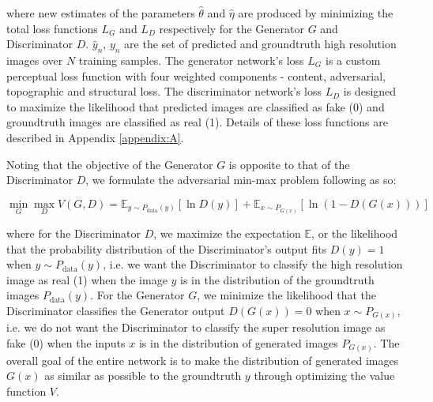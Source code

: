 \documentclass[tc, manuscript]{copernicus}
\begin{document}
where new estimates of the parameters $\hat{\theta}$ and $\hat{\eta}$ are produced by minimizing the total loss functions $L_G$ and $L_D$ respectively for the Generator $G$ and Discriminator $D$.
$\hat{y}_n$, $y_n$ are the set of predicted and groundtruth high resolution images over $N$ training samples.
The generator network's loss $L_G$ is a custom perceptual loss function with four weighted components - content, adversarial, topographic and structural loss.
The discriminator network's loss $L_D$ is designed to maximize the likelihood that predicted images are classified as fake (0) and groundtruth images are classified as real (1).
Details of these loss functions are described in Appendix \ref{appendix:A}.

Noting that the objective of the Generator $G$ is opposite to that of the Discriminator $D$, we formulate the adversarial min-max problem following \citet{GoodfellowGenerativeAdversarialNetworks2014} as so:

\begin{equation}\label{eq:4}
  \min_{G} \max_{D} V(G,D) = \mathbb{E}_{y \sim P_{\text{data}}(y)}[\ln D(y)] + \mathbb{E}_{x \sim P_{G(x)}}[\ln(1-D(G(x)))]
\end{equation}

where for the Discriminator $D$, we maximize the expectation $\mathbb{E}$, or the likelihood that the probability distribution of the Discriminator's output fits $D(y)=1$ when $y \sim P_{\text{data}}(y)$, i.e. we want the Discriminator to classify the high resolution image as real (1) when the image $y$ is in the distribution of the groundtruth images $P_{\text{data}}(y)$.
For the Generator $G$, we minimize the likelihood that the Discriminator classifies the Generator output $D(G(x))=0$ when $x \sim P_{G(x)}$, i.e. we do not want the Discriminator to classify the super resolution image as fake (0) when the inputs $x$ is in the distribution of generated images $P_{G(x)}$.
The overall goal of the entire network is to make the distribution of generated images $G(x)$ as similar as possible to the groundtruth $y$ through optimizing the value function $V$.
\end{document}

